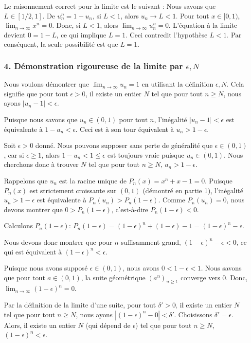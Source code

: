 \documentclass[a4paper,11pt]{report}
\begin{document}
Le raisonnement correct pour la limite est le suivant :
Nous savons que $L \in [1/2, 1]$.
De $u_n^n = 1 - u_n$, si $L < 1$, alors $u_n \to L < 1$.
Pour tout $x \in [0,1)$, $\lim_{n \to \infty} x^n = 0$.
Donc, si $L < 1$, alors $\lim_{n \to \infty} u_n^n = 0$.
L'équation à la limite devient $0 = 1 - L$, ce qui implique $L = 1$.
Ceci contredit l'hypothèse $L < 1$.
Par conséquent, la seule possibilité est que $L = 1$.

\subsubsection*{4. Démonstration rigoureuse de la limite par $\epsilon, N$}

Nous voulons démontrer que $\lim_{n \to \infty} u_n = 1$ en utilisant la définition $\epsilon, N$.
Cela signifie que pour tout $\epsilon > 0$, il existe un entier $N$ tel que pour tout $n \ge N$, nous ayons $|u_n - 1| < \epsilon$.

Puisque nous savons que $u_n \in (0,1)$ pour tout $n$, l'inégalité $|u_n - 1| < \epsilon$ est équivalente à $1 - u_n < \epsilon$.
Ceci est à son tour équivalent à $u_n > 1 - \epsilon$.

Soit $\epsilon > 0$ donné.
Nous pouvons supposer sans perte de généralité que $\epsilon \in (0,1)$, car si $\epsilon \ge 1$, alors $1-u_n < 1 \le \epsilon$ est toujours vraie puisque $u_n \in (0,1)$.
Nous cherchons donc à trouver $N$ tel que pour tout $n \ge N$, $u_n > 1 - \epsilon$.

Rappelons que $u_n$ est la racine unique de $P_n(x) = x^n + x - 1 = 0$.
Puisque $P_n(x)$ est strictement croissante sur $(0,1)$ (démontré en partie 1), l'inégalité $u_n > 1 - \epsilon$ est équivalente à $P_n(u_n) > P_n(1 - \epsilon)$.
Comme $P_n(u_n) = 0$, nous devons montrer que $0 > P_n(1 - \epsilon)$, c'est-à-dire $P_n(1 - \epsilon) < 0$.

Calculons $P_n(1 - \epsilon)$:
$P_n(1 - \epsilon) = (1 - \epsilon)^n + (1 - \epsilon) - 1 = (1 - \epsilon)^n - \epsilon$.

Nous devons donc montrer que pour $n$ suffisamment grand, $(1 - \epsilon)^n - \epsilon < 0$, ce qui est équivalent à $(1 - \epsilon)^n < \epsilon$.

Puisque nous avons supposé $\epsilon \in (0,1)$, nous avons $0 < 1 - \epsilon < 1$.
Nous savons que pour tout $a \in (0,1)$, la suite géométrique $(a^n)_{n \ge 1}$ converge vers 0.
Donc, $\lim_{n \to \infty} (1 - \epsilon)^n = 0$.

Par la définition de la limite d'une suite, pour tout $\delta' > 0$, il existe un entier $N$ tel que pour tout $n \ge N$, nous ayons $|(1 - \epsilon)^n - 0| < \delta'$.
Choisissons $\delta' = \epsilon$.
Alors, il existe un entier $N$ (qui dépend de $\epsilon$) tel que pour tout $n \ge N$, $(1 - \epsilon)^n < \epsilon$.
\end{document}
